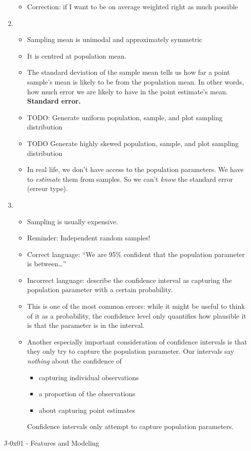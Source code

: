 \documentclass{article}
\begin{document}
\begin{enumerate}
\begin{itemize}
  \item Correction: if I want to be on average weighted right as much possible
  \end{itemize}
\item {}
  \begin{itemize}
  \item Sampling mean is unimodal and approximately symmetric
  \item It is centred at population mean.
    \item The standard deviation of the sample mean tells us how far a
      point sample's mean is likely to be from the population mean.
      In other words, how much error we are likely to have in the
      point estimate's mean.  \textbf{Standard error.}
    \item TODO: Generate uniform population, sample,
      and plot sampling distribution
    \item TODO Generate highly skewed population, sample, and plot
      sampling distribution
    \item In real life, we don't have access to the population
      parameters.  We have to \textit{estimate} them from samples.  So
      we can't \textit{know} the standard error (erreur type).
  \end{itemize}
\item {}
  \begin{itemize}
  \item Sampling is usually expensive.
  \item Reminder:  Independent random samples!
  \item
    Correct language: ``We are 95\% confident that the population
    parameter is between\dots''
  \item
    Incorrect language: describe the confidence interval as capturing
    the population parameter with a certain probability.
  \item
    This is one of the most common errors: while it might be useful to
    think of it as a probability, the confidence level only quantifies
    how plausible it is that the parameter is in the interval.
  \item
    Another especially important consideration of confidence intervals
    is that they only try to capture the population parameter. Our
    intervals say \textit{nothing} about the confidence of
    \begin{itemize}
    \item capturing individual observations
    \item a proportion of the observations
    \item about capturing point estimates
    \end{itemize}
    Confidence intervals only attempt to capture population
    parameters.
  \end{itemize}
\end{enumerate}

\vspace{10mm}
\centerline{\Large J-0x01 - Features and Modeling}
\vspace{5mm}
\end{document}
